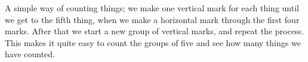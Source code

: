 A simple way of counting things; we make one vertical mark
for each thing until we get to the fifth thing, when we make 
a horizontal mark through the first four marks. After that we 
start a new group of vertical marks, and repeat the process.
This makes it quite easy to count the groups of five and see how
many things we have counted.